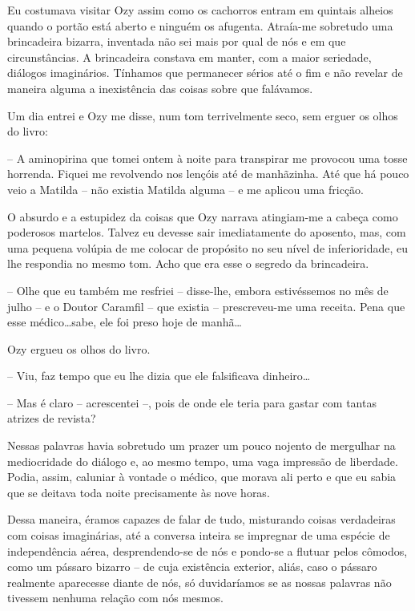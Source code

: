 Eu costumava visitar Ozy assim como os cachorros entram em quintais alheios quando o portão está aberto e ninguém os afugenta. Atraía-me sobretudo uma brincadeira bizarra, inventada não sei mais por qual de nós e em que circunstâncias. A brincadeira constava em manter, com a maior seriedade, diálogos imaginários. Tínhamos que permanecer sérios até o fim e não revelar de maneira alguma a inexistência das coisas sobre que falávamos.

Um dia entrei e Ozy me disse, num tom terrivelmente seco, sem erguer os olhos do livro:

-- A aminopirina que tomei ontem à noite para transpirar me provocou uma tosse horrenda. Fiquei me revolvendo nos lençóis até de manhãzinha. Até que há pouco veio a Matilda -- não existia Matilda alguma -- e me aplicou uma fricção.

O absurdo e a estupidez da coisas que Ozy narrava atingiam-me a cabeça como poderosos martelos. Talvez eu devesse sair imediatamente do aposento, mas, com uma pequena volúpia de me colocar de propósito no seu nível de inferioridade, eu lhe respondia no mesmo tom. Acho que era esse o segredo da brincadeira.

-- Olhe que eu também me resfriei -- disse-lhe, embora estivéssemos no mês de julho -- e o Doutor Caramfil -- que existia -- prescreveu-me uma receita. Pena que esse médico\dots sabe, ele foi preso hoje de manhã\dots

Ozy ergueu os olhos do livro.

-- Viu, faz tempo que eu lhe dizia que ele falsificava dinheiro\dots

-- Mas é claro -- acrescentei --, pois de onde ele teria para gastar com tantas atrizes de revista?

Nessas palavras havia sobretudo um prazer um pouco nojento de mergulhar na mediocridade do diálogo e, ao mesmo tempo, uma vaga impressão de liberdade. Podia, assim, caluniar à vontade o médico, que morava ali perto e que eu sabia que se deitava toda noite precisamente às nove horas. 

Dessa maneira, éramos capazes de falar de tudo, misturando coisas verdadeiras com coisas imaginárias, até a conversa inteira se impregnar de uma espécie de independência aérea, desprendendo-se de nós e pondo-se a flutuar pelos cômodos, como um pássaro bizarro -- de cuja existência exterior, aliás, caso o pássaro realmente aparecesse diante de nós, só duvidaríamos se as nossas palavras não tivessem nenhuma relação com nós mesmos.

